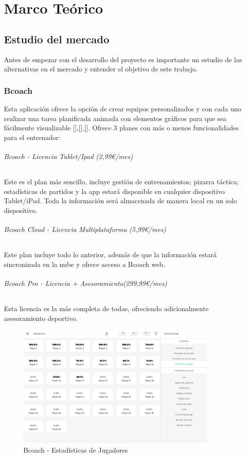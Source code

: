
\chapter{Marco Teórico}
\label{marcoteorico} 

\section{Estudio del mercado}
Antes de empezar con el desarrollo del proyecto es importante un estudio de las alternativas en el mercado y entender el objetivo de este trabajo.

\subsection{Bcoach}
Esta aplicación ofrece la opción de crear equipos personalizados y con cada uno realizar una tarea planificada animada con elementos gráficos para que sea fácilmente visualizable [\cite{BcoachWeb}],[\cite{BcoachVideo}],[\cite{BcoachVideo2}]. Ofrece 3 planes con más o menos funcionalidades para el entrenador:

\subparagraph{Bcoach - Licencia Tablet/Ipad (2,99€/mes)}
Este es el plan más sencillo, incluye gestión de entrenamientos; pizarra táctica; estadísticas de partidos y la app estará disponible en cualquier dispositivo Tablet/iPad. Toda la información será almacenada de manera local en un solo dispositivo.

\subparagraph{Bcoach Cloud - Licencia Multiplataforma (5,99€/mes)}
Este plan incluye todo lo anterior, además de que la información estará sincronizada en la nube y ofrece acceso a Bcoach web.

\subparagraph{Bcoach Pro - Licencia + Asesoramiento(299,99€/mes)}
Esta licencia es la más completa de todas, ofreciendo adicionalmente asesoramiento deportivo.

\begin{figure}[H]
    \centering
    \includegraphics[width=10cm]{archivos/tfg_jorge/bcoach_ests_jugadores}
    \caption{Bcoach - Estadísticas de Jugadores}\label{sistemass2}
\end{figure}

